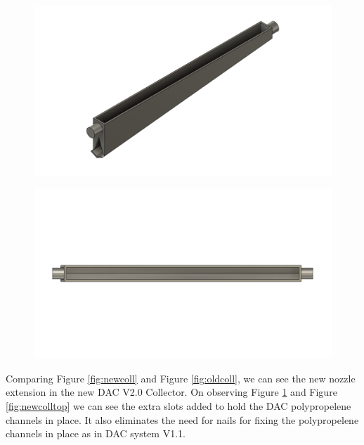 \begin{itemize}
    
    \begin{figure}[H]
        \centering
        \begin{minipage}{.5\textwidth}
        \centering
        \includegraphics[width=\linewidth]{images/mywork/Sprint4/Collector_old.png}
         \label{fig:oldcoll}
    \end{minipage}%
    \begin{minipage}{.5\textwidth}
        \centering
        \includegraphics[width=\linewidth]{images/mywork/Sprint4/Collector_old_top.png}
        \label{fig:oldcolltop}
    \end{minipage}
    \end{figure}
    
    
        Comparing Figure \ref{fig:newcoll} and Figure \ref{fig:oldcoll}, we can see the new nozzle extension in the new DAC V2.0 Collector. On observing Figure \ref{fig:oldcolltop} and Figure \ref{fig:newcolltop} we can see the extra slots added to hold the DAC polypropelene channels in place. It also eliminates the need for nails for fixing the polypropelene channels in place as in DAC system V1.1. 
        

\end{itemize}

